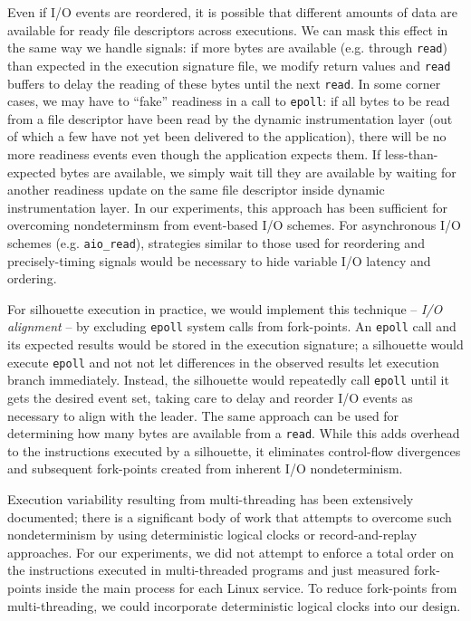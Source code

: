 Even if I/O events are reordered,
it is possible that different amounts
of data are available for ready
file descriptors across executions. We can 
mask this effect in the same
way we handle signals: if more bytes
are available (e.g. through \texttt{read}) 
than expected in the execution signature
file, we modify return values and \texttt{read}
buffers to delay the reading of these bytes
until the next \texttt{read}. In some corner
cases, we may have to ``fake'' readiness
in a call to \texttt{epoll}: if all bytes to be read from
a file descriptor have been read by 
the dynamic instrumentation layer (out of which
a few have not yet been delivered to the application),
there will be no more readiness events even
though the application expects them. If less-than-expected
bytes are available, we simply wait
till they are available by waiting for
another readiness update on the same file descriptor inside 
dynamic instrumentation layer.
In our experiments, this approach has been sufficient 
for overcoming nondeterminsm from event-based I/O
schemes.
For asynchronous I/O schemes (e.g. \texttt{aio\_read}), strategies
similar to those used for reordering
and precisely-timing signals would be necessary to hide
variable I/O latency and ordering.

For silhouette execution in practice,
we would implement this technique -- {\em I/O alignment} -- by excluding \texttt{epoll} system calls
from fork-points. An \texttt{epoll}
call and its expected results
would be stored in the execution signature;
a silhouette would execute \texttt{epoll}
and not not let differences in the observed results 
let execution branch immediately. Instead,
the silhouette would repeatedly call
\texttt{epoll} until it gets the desired
event set, taking care to delay
and reorder I/O events as necessary
to align with the leader.
The same approach
can be used for determining 
how many bytes are available
from a \texttt{read}. While this 
adds overhead to the instructions
executed by a silhouette, it eliminates control-flow 
divergences and subsequent fork-points created from
inherent I/O nondeterminism. \newline

 \newline
Execution variability resulting from multi-threading
has been extensively documented; there
is a significant body of work that
attempts to overcome such nondeterminism
by using deterministic logical clocks
or record-and-replay approaches. 
For our experiments, we did not attempt to enforce
a total order on the instructions executed in multi-threaded
programs and just measured fork-points inside 
the main process for each Linux service.
To reduce fork-points from multi-threading, we could incorporate
deterministic logical clocks 
into our design.

